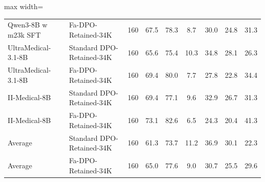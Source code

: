\documentclass[a4paper,fleqn,doubleblind]{cas-sc}
\begin{document}
\begin{table}[htbp]
\begin{adjustbox}{max width=\textwidth}
\begin{tabular}{llccccccc}
        Qwen3-8B w m23k SFT & Fa-DPO-Retained-34K & 160 & 67.5 & 78.3 & 8.7 & 30.0 & 24.8 & 31.3 \\
        UltraMedical-3.1-8B & Standard DPO-Retained-34K & 160 & 65.6 & 75.4 & 10.3 & 34.8 & 28.1 & 26.3 \\
        UltraMedical-3.1-8B & Fa-DPO-Retained-34K & 160 & 69.4 & 80.0 & 7.7 & 27.8 & 22.8 & 34.4 \\
        II-Medical-8B & Standard DPO-Retained-34K & 160 & 69.4 & 77.1 & 9.6 & 32.9 & 26.7 & 31.3 \\
        II-Medical-8B & Fa-DPO-Retained-34K & 160 & 73.1 & 82.6 & 6.5 & 24.3 & 20.4 & 41.3 \\
        \midrule
        Average & Standard DPO-Retained-34K & 160 & 61.3 & 73.7 & 11.2 & 36.9 & 30.1 & 22.3 \\
        Average & Fa-DPO-Retained-34K & 160 & 65.0 & 77.6 & 9.0 & 30.7 & 25.5 & 29.6 \\
        \bottomrule
    \end{tabular}
    \endgroup
    \end{adjustbox}
\end{table}
\end{document}

